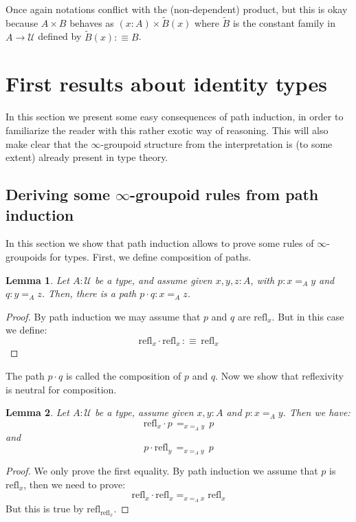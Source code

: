 \documentclass{article}
\newcommand{\se}[1]{\medbreak \medbreak \section{#1}}
\newcommand{\sse}[1]{\medbreak \subsection{#1}}
\newcommand{\U}{{\mathcal U}}
\renewcommand{\r}{\rightarrow}
\newcommand{\refl}{\mathrm{refl}}
\newtheorem{lemma}{Lemma}
\begin{document}
Once again notations conflict with the (non-dependent) product, but this is okay because $A\times B$ behaves as $(x:A)\times \tilde{B}(x)$  where $\tilde{B}$ is the constant family in $A\r \U$ defined by $\tilde{B}(x) :\equiv B$. %





\se{First results about identity types}

In this section we present some easy consequences of path induction, in order to familiarize the reader with this rather exotic way of reasoning. This will also make clear that the $\infty$-groupoid structure from the interpretation is (to some extent) already present in type theory.


\sse{Deriving some $\infty$-groupoid rules from path induction}




In this section we show that path induction allows to prove some rules of $\infty$-groupoids for types. First, we define composition of paths.

\begin{lemma}
Let $A:\U$ be a type, and assume given $x,y,z:A$, with $p:x=_A y$ and $q:y=_A z$. Then, there is a path $p\cdot q: x=_Az$.
\end{lemma}
\begin{proof}
By path induction we may assume that $p$ and $q$ are $\refl_x$. But in this case we define:
\[\refl_x\cdot\refl_x \, :\equiv\,  \refl_x\]
\end{proof}

The path $p\cdot q$ is called the composition of $p$ and $q$. Now we show that reflexivity is neutral for composition. 

\begin{lemma}
Let $A:\U$ be a type, assume given $x,y:A$ and $p:x=_Ay$. Then we have:
\[\refl_x\cdot p \, =_{x=_Ay}\, p\]
and
\[p\cdot \refl_y \, =_{x=_Ay}\, p\]
\end{lemma}
\begin{proof}
We only prove the first equality. By path induction we assume that $p$ is $\refl_x$, then we need to prove:
\[\refl_x\cdot\refl_x =_{x=_Ax} \refl_x\]
But this is true by $\refl_{\refl_x}$.
\end{proof}
\end{document}
